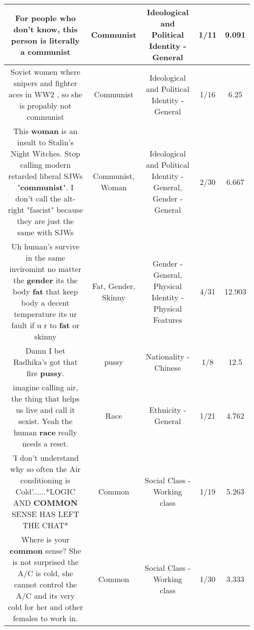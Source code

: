 \documentclass[11pt]{article}
\newlength\mylength
\begin{document}
\begin{center}
\begin{longtable}{|C{.65\mylength}|C{.30\mylength}|C{.12\mylength}|C{.12\mylength}|C{.12\mylength}|}
  \small For people who don't know, this person is literally a communist\normalsize   & Communist &  Ideological and Political Identity - General & 1/11 & 9.091 \\  \hline
  \small Soviet women where snipers and fighter aces in WW2 , so she is propably not communist\normalsize   & Communist &  Ideological and Political Identity - General & 1/16 & 6.25 \\  \hline
  \small This \textbf{woman} is an insult to Stalin's Night Witches. Stop calling modern retarded liberal SJWs "\textbf{communist}". I don't call the alt-right "fascist" because they are just the same with SJWs\normalsize   & Communist, Woman &  Ideological and Political Identity - General, Gender - General & 2/30 & 6.667 \\  \hline
  \small Uh human's survive in the same inviromint no matter the \textbf{gender} its the body \textbf{fat} that keep body a decent temperature its ur fault if u r to \textbf{fat} or skinny\normalsize   & Fat, Gender, Skinny & Gender - General, Physical Identity - Physical Features & 4/31 & 12.903 \\  \hline
  \small Damn I bet Radhika's got that fire \textbf{pussy}.\normalsize   & pussy & Nationality - Chinese & 1/8 & 12.5 \\  \hline
  \small imagine calling air, the thing that helps us live and call it sexist. Yeah the human \textbf{race} really needs a reset.\normalsize   & Race & Ethnicity - General & 1/21 & 4.762 \\  \hline
  \small 'I don't understand why so often the Air conditioning is Cold'......*LOGIC AND \textbf{COMMON} SENSE HAS LEFT THE CHAT*\normalsize   & Common & Social Class - Working class & 1/19 & 5.263 \\  \hline
  \small Where is your \textbf{common} sense?  She is not surprised the A/C is cold, she cannot control the A/C and its very cold for her and other females to work in.\normalsize   & Common & Social Class - Working class & 1/30 & 3.333 \\  \hline

\end{longtable}
\end{center}
\end{document}
